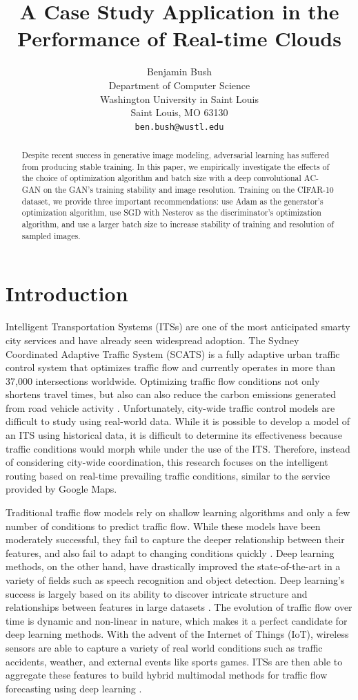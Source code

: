\documentclass{article}
\title{A Case Study Application in the Performance of Real-time Clouds}
\author{
  Benjamin Bush \\
  Department of Computer Science\\
  Washington University in Saint Louis\\
  Saint Louis, MO 63130 \\
  \texttt{ben.bush@wustl.edu} \\
}
\begin{document}
\maketitle

\begin{abstract}
Despite recent success in generative image modeling, adversarial learning has suffered from producing stable training. In this paper, we empirically investigate the effects of the choice of optimization algorithm and batch size with a deep convolutional AC-GAN on the GAN's training stability and image resolution. Training on the CIFAR-10 dataset, we provide three important recommendations: use Adam as the generator's optimization algorithm, use SGD with Nesterov as the discriminator's optimization algorithm, and use a larger batch size to increase stability of training and resolution of sampled images.  
\end{abstract}
\section{Introduction}
Intelligent Transportation Systems (ITSs) are one of the most anticipated smarty city services and have already seen widespread adoption. The Sydney Coordinated Adaptive Traffic System (SCATS) is a fully adaptive urban traffic control system that optimizes traffic flow and currently operates in more than 37,000 intersections worldwide. Optimizing traffic flow conditions not only shortens travel times, but also can also reduce the carbon emissions generated from road vehicle activity \citep{scats_env}. Unfortunately, city-wide traffic control models are difficult to study using real-world data. While it is possible to develop a model of an ITS using historical data, it is difficult to determine its effectiveness because traffic conditions would morph while under the use of the ITS. Therefore, instead of considering city-wide coordination, this research focuses on the intelligent routing based on real-time prevailing traffic conditions, similar to the service provided by Google Maps. 

Traditional traffic flow models rely on shallow learning algorithms and only a few number of conditions to predict traffic flow. While these models have been moderately successful, they fail to capture the deeper relationship between their features, and also fail to adapt to changing conditions quickly \citep{modeling}. Deep learning methods, on the other hand, have drastically improved the state-of-the-art in a variety of fields such as speech recognition and object detection. Deep learning's success is largely based on its ability to discover intricate structure and relationships between features in large datasets \citep{deep_learning}. The evolution of traffic flow over time is dynamic and non-linear in nature, which makes it a perfect candidate for deep learning methods. With the advent of the Internet of Things (IoT), wireless sensors are able to capture a variety of real world conditions such as traffic accidents, weather, and external events like sports games. ITSs are then able to aggregate these features to build hybrid multimodal methods for traffic flow forecasting using deep learning \citep{hybrid, xiaochus}. 
\end{document}
